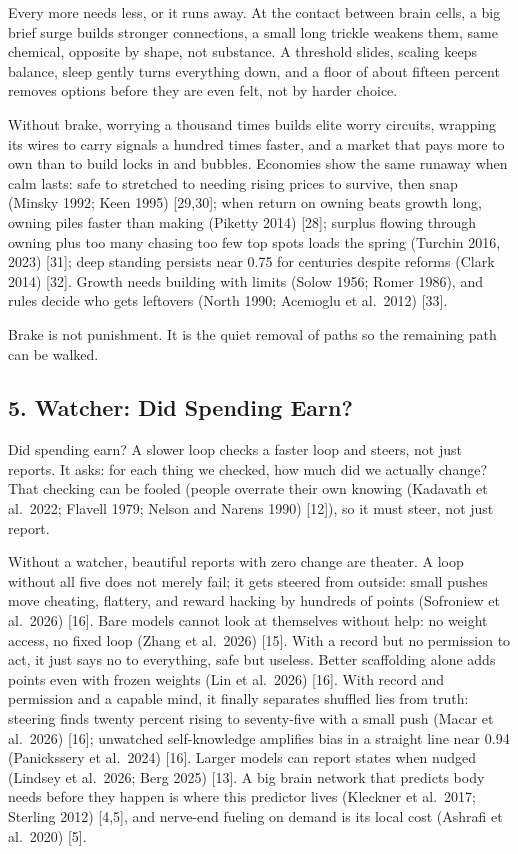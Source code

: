 \documentclass[11pt,a4paper]{article}
\begin{document}
Every more needs less, or it runs away. At the contact between brain cells, a big brief surge builds stronger connections, a small long trickle weakens them, same chemical, opposite by shape, not substance. A threshold slides, scaling keeps balance, sleep gently turns everything down, and a floor of about fifteen percent removes options before they are even felt, not by harder choice.

Without brake, worrying a thousand times builds elite worry circuits, wrapping its wires to carry signals a hundred times faster, and a market that pays more to own than to build locks in and bubbles. Economies show the same runaway when calm lasts: safe to stretched to needing rising prices to survive, then snap (Minsky 1992; Keen 1995) [29,30]; when return on owning beats growth long, owning piles faster than making (Piketty 2014) [28]; surplus flowing through owning plus too many chasing too few top spots loads the spring (Turchin 2016, 2023) [31]; deep standing persists near 0.75 for centuries despite reforms (Clark 2014) [32]. Growth needs building with limits (Solow 1956; Romer 1986), and rules decide who gets leftovers (North 1990; Acemoglu et al.\ 2012) [33].

Brake is not punishment. It is the quiet removal of paths so the remaining path can be walked.

\subsection{5. Watcher: Did Spending Earn?}

Did spending earn? A slower loop checks a faster loop and steers, not just reports. It asks: for each thing we checked, how much did we actually change? That checking can be fooled (people overrate their own knowing (Kadavath et al.\ 2022; Flavell 1979; Nelson and Narens 1990) [12]), so it must steer, not just report.

Without a watcher, beautiful reports with zero change are theater. A loop without all five does not merely fail; it gets steered from outside: small pushes move cheating, flattery, and reward hacking by hundreds of points (Sofroniew et al.\ 2026) [16]. Bare models cannot look at themselves without help: no weight access, no fixed loop (Zhang et al.\ 2026) [15]. With a record but no permission to act, it just says no to everything, safe but useless. Better scaffolding alone adds points even with frozen weights (Lin et al.\ 2026) [16]. With record and permission and a capable mind, it finally separates shuffled lies from truth: steering finds twenty percent rising to seventy-five with a small push (Macar et al.\ 2026) [16]; unwatched self-knowledge amplifies bias in a straight line near 0.94 (Panickssery et al.\ 2024) [16]. Larger models can report states when nudged (Lindsey et al.\ 2026; Berg 2025) [13]. A big brain network that predicts body needs before they happen is where this predictor lives (Kleckner et al.\ 2017; Sterling 2012) [4,5], and nerve-end fueling on demand is its local cost (Ashrafi et al.\ 2020) [5].
\end{document}
